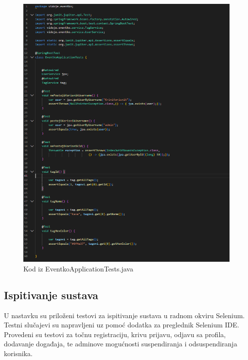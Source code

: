 			\begin{figure}[H]
				\includegraphics[width=\textwidth]{Slike/EventkoApplicationTests.png}
				\caption{Kod iz EventkoApplicationTests.java}
			\end{figure}
			
			\eject
			
			
			\subsection{Ispitivanje sustava}
			
			 
			 
		 	
		 	\indent U nastavku su priloženi testovi za ispitivanje sustava u radnom okviru Selenium. Testni slučajevi su napravljeni uz pomoć dodatka za preglednik Selenium IDE. Provedeni su testovi za točnu registraciju, krivu prijavu, odjavu sa profila, dodavanje događaja, te adminove mogućnosti suspendiranja i odsuspendiranja korisnika.
		 	
